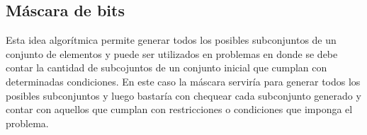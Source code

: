 \subsection{Máscara de bits}
Esta idea algorítmica permite generar todos los posibles subconjuntos de un conjunto de elementos y puede ser utilizados en problemas en donde se debe contar la cantidad de subcojuntos
de un conjunto inicial que cumplan con determinadas condiciones. En este caso la máscara serviría para generar todos los posibles subconjuntos y luego bastaría con chequear cada subconjunto
generado y contar con aquellos que cumplan con restricciones o condiciones que imponga el problema.